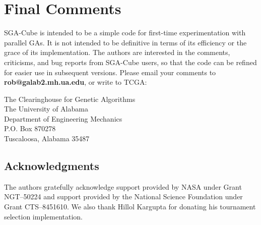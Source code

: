 \section{Final Comments}
SGA-Cube is intended to be a simple
code for first-time experimentation with parallel GAs. It is 
not intended to be 
definitive in terms of its efficiency 
or the grace of its implementation. The
authors are interested in the comments, criticisms, and bug reports
from SGA-Cube users, so that the code can be refined for
easier use in subsequent versions.
Please email your comments to {\bf rob@galab2.mh.ua.edu},
or write to TCGA:
\begin{center}
The Clearinghouse for Genetic Algorithms\\
The University of Alabama\\
Department of Engineering Mechanics\\
P.O. Box 870278\\
Tuscaloosa, Alabama 35487
\end{center}

\subsection*{Acknowledgments}
The authors gratefully acknowledge support provided by NASA under
Grant NGT--50224 and support provided by the 
National Science Foundation under Grant CTS--8451610.
We also thank Hillol Kargupta for donating his tournament selection
implementation.





